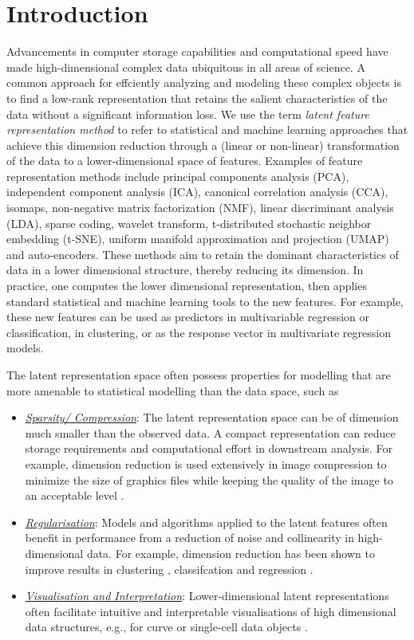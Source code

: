 \section{Introduction}

Advancements in computer storage capabilities and computational speed have made high-dimensional complex data ubiquitous in all areas of science. A common approach for effciently analyzing and modeling these complex objects is to find a low-rank representation that retains the salient characteristics of the data without a significant information loss.
We use the term \emph{latent feature representation method} to refer to statistical and machine learning approaches that achieve this dimension reduction through a (linear or non-linear) transformation of the data to a lower-dimensional space of features.
Examples of feature representation methods include principal components analysis (PCA), independent component analysis (ICA), canonical correlation analysis (CCA), isomaps, non-negative matrix factorization (NMF), linear discriminant analysis (LDA), sparse coding, wavelet transform, t-distributed stochastic neighbor embedding (t-SNE), uniform manifold approximation and projection (UMAP) and auto-encoders. 
These methods aim to retain the dominant characteristics of data in a lower dimensional structure, thereby reducing its dimension. 
In practice, one computes the lower dimensional representation, then applies standard statistical and machine learning tools to the new features. 
For example, these new features can be used as predictors in multivariable regression or classification, in clustering, or as the response vector in multivariate regression models.

The latent representation space often possess properties for modelling that are more amenable to statistical modelling than the data space, such as
\begin{itemize}
    \item \emph{\underline{Sparsity/ Compression}}: The latent representation space can be of dimension much smaller than the observed data. A compact representation can reduce storage requirements and computational effort in downstream analysis. For example, dimension reduction is used extensively in image compression to minimize the size of graphics files while keeping the quality of the image to an acceptable level \parencite{marcellin_overview_2000}.
    \item \emph{\underline{Regularisation}}: Models and algorithms applied to the latent features often benefit in performance from a reduction of noise and collinearity in high-dimensional data. For example, dimension reduction has been shown to improve results in clustering \parencite{niu_dimensionality_2011}, classifcation \parencite{wang_role_2014} and regression \parencite{cook_fisher_2007}.
    \item \emph{\underline{Visualisation and Interpretation}}: Lower-dimensional latent representations often facilitate intuitive and interpretable visualisations of high dimensional data structures, e.g., for curve or single-cell data objects \parencite{jones_displaying_1992, maaten_visualizing_2008, hyndman_rainbow_2010, becht_dimensionality_2019}.
\end{itemize}

